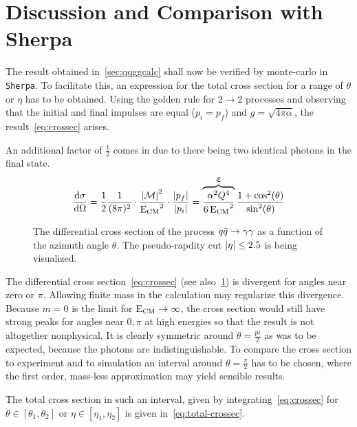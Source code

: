 \section{Discussion and Comparison with Sherpa}%
\label{sec:compsher}

The result obtained in~\ref{sec:qqggcalc} shall now be verified by
monte-carlo in \verb|Sherpa|. To facilitate this, an expression for
the total cross section for a range of \(\theta\) or \(\eta\) has to
be obtained. Using the golden rule for \(2\rightarrow 2\) processes
and observing that the initial and final impulses are equal
(\(p_i=p_f\)) and \(g=\sqrt{4\pi\alpha}\), the
result~\eqref{eq:crossec} arises.

An additional factor of \(\frac{1}{2}\) comes in due to there being
two identical photons in the final state.
\begin{equation}
  \label{eq:crossec}
  \dv{\sigma}{\Omega} =
  \frac{1}{2}\frac{1}{(8\pi)^2}\cdot\frac{\abs{\mathcal{M}}^2}{\operatorname{E_{\text{CM}}}^2}\cdot\frac{\abs{p_f}}{\abs{p_i}}
  = \overbrace{\frac{\alpha^2Q^4}{6\operatorname{E_{\text{CM}}}^2}}^{\mathfrak{C}}\frac{1+\cos^2(\theta)}{\sin^2(\theta)}
\end{equation}


\begin{figure}[ht]
  \centering
  \caption[Plot of the differential cross section of the \(\qqgg\)
  process.]{\label{fig:diffxs} The differential cross section of the
    process \(\qqgg\) as a function of the azimuth angle
    \(\theta\). The pseudo-rapdity cut \(\abs{\eta} \leq 2.5\) is
    being visualized.}
\end{figure}

The differential cross section~\eqref{eq:crossec} (see
also~\ref{fig:diffxs}) is divergent for angles near zero or
\(\pi\). Allowing finite mass in the calculation may regularize this
divergence. Because \(m=0\) is the limit for
\(\operatorname{E_{\text{CM}}}\rightarrow\infty\), the cross section would still have strong
peaks for angles near \(0,\pi\) at high energies so that the result is
not altogether nonphysical. It is clearly symmetric around
\(\theta=\frac{pi}{2}\) as was to be expected, because the photons are
indistinguishable. To compare the cross section to experiment and to
simulation an interval around \(\theta=\frac{\pi}{2}\) has to be
chosen, where the first order, mass-less approximation may yield
sensible results.

The total cross section in such an interval, given by
integrating~\eqref{eq:crossec} for \(\theta\in [\theta_1, \theta_2]\)
or \(\eta\in [\eta_1, \eta_2]\) is given in~\eqref{eq:total-crossec}.

